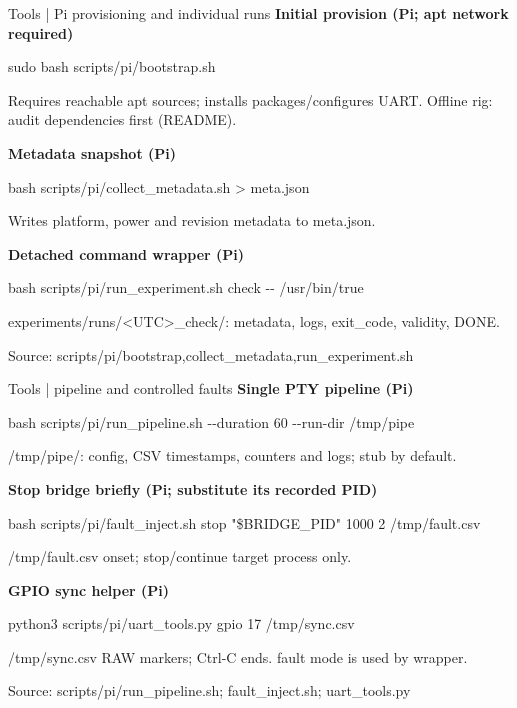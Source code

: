\documentclass[aspectratio=169,12pt,t]{beamer}
\newcommand{\src}[1]{\par\vfill{\small\color{muted}Source: #1}}
\begin{document}
\begin{frame}{Tools | Pi provisioning and individual runs}
\textbf{Initial provision (Pi; apt network required)}\par{\ttfamily sudo bash scripts/pi/bootstrap.sh}\par Requires reachable apt sources; installs packages/configures UART. Offline rig: audit dependencies first (README).\par\medskip
\textbf{Metadata snapshot (Pi)}\par{\ttfamily bash scripts/pi/collect\_metadata.sh > meta.json}\par Writes platform, power and revision metadata to meta.json.\par\medskip
\textbf{Detached command wrapper (Pi)}\par{\ttfamily bash scripts/pi/run\_experiment.sh check -{}- /usr/bin/true}\par experiments/runs/<UTC>\_check/: metadata, logs, exit\_code, validity, DONE.\par\medskip
\src{scripts/pi/{bootstrap,collect\_metadata,run\_experiment}.sh}
\end{frame}
\begin{frame}{Tools | pipeline and controlled faults}
\textbf{Single PTY pipeline (Pi)}\par{\ttfamily bash scripts/pi/run\_pipeline.sh -{}-duration 60 -{}-run-dir /tmp/pipe}\par /tmp/pipe/: config, CSV timestamps, counters and logs; stub by default.\par\medskip
\textbf{Stop bridge briefly (Pi; substitute its recorded PID)}\par{\ttfamily bash scripts/pi/fault\_inject.sh stop "\$BRIDGE\_PID" 1000 2 /tmp/fault.csv}\par /tmp/fault.csv onset; stop/continue target process only.\par\medskip
\textbf{GPIO sync helper (Pi)}\par{\ttfamily python3 scripts/pi/uart\_tools.py gpio 17 /tmp/sync.csv}\par /tmp/sync.csv RAW markers; Ctrl-C ends. fault mode is used by wrapper.\par\medskip
\src{scripts/pi/run\_pipeline.sh; fault\_inject.sh; uart\_tools.py}
\end{frame}
\end{document}
